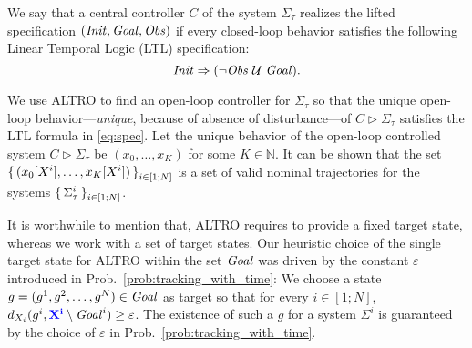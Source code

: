 We say that a central controller $C$ of the system $\Sigma_\tau$ realizes the lifted specification $(\mathit{Init},\mathit{Goal},\mathit{Obs})$ if every closed-loop behavior satisfies the following Linear Temporal Logic (LTL) specification:
\begin{equation}\label{eq:spec}
	\mathit{Init} \Rightarrow (\lnot \mathit{Obs} \ \mathcal{U}\ \mathit{Goal}).
\end{equation} 

We use ALTRO to find an open-loop controller for $\Sigma_\tau$ so that the unique open-loop behavior---\emph{unique}, because of absence of disturbance---of $C \triangleright\Sigma_\tau$ satisfies the LTL formula in \eqref{eq:spec}.
Let the unique behavior of the  open-loop controlled system $C \triangleright\Sigma_\tau$ be $(x_0,\ldots,x_K)$ for some $K\in \mathbb{N}$.
It can be shown that the set $\set{(x_0[X^i],\ldots,x_K[X^i])}_{i\in [1;N]}$ is a set of valid nominal trajectories for the systems $\set{\Sigma^i_\tau}_{i\in [1;N]}$.

It is worthwhile to mention that, ALTRO requires to provide a fixed target state, whereas we work with a set of target states.
Our heuristic choice of the single target state for ALTRO within the set $\mathit{Goal}$ was driven by the constant $\varepsilon$ introduced in Prob.~\ref{prob:tracking_with_time}:
We choose a state $g=(g^1,g^2,\dots,g^N)\in \mathit{Goal}$ as target so that for every $i\in [1;N]$, $d_{X_i}(g^i, {\color{blue} \mathbf{X^i}}\setminus \mathit{Goal}^i) \geq \varepsilon$.
The existence of such a $g$ for a system $\Sigma^i$ is guaranteed by the choice of $\varepsilon$ in Prob.~\ref{prob:tracking_with_time}. 

%
%	

